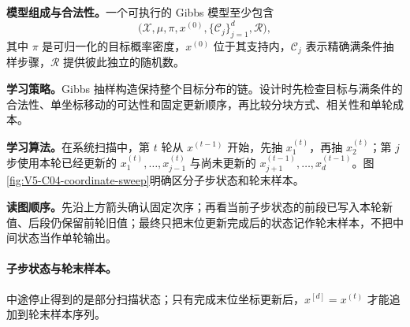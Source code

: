 \documentclass[UTF8,a4paper,11pt,openany]{ctexbook}
\begin{document}
\setcounter{page}{669}
\setcounter{chapter}{33}
\setcounter{figure}{2}
\pagestyle{headings}

\textbf{模型组成与合法性。}一个可执行的 Gibbs 模型至少包含
\[
\bigl(\mathcal X,\mu,\pi,x^{(0)},\{\mathcal C_j\}_{j=1}^d,\mathcal R\bigr),
\]
其中 $\pi$ 是可归一化的目标概率密度，$x^{(0)}$ 位于其支持内，$\mathcal C_j$ 表示精确满条件抽样步骤，$\mathcal R$ 提供彼此独立的随机数。

\textbf{学习策略。}Gibbs 抽样构造保持整个目标分布的链。设计时先检查目标与满条件的合法性、单坐标移动的可达性和固定更新顺序，再比较分块方式、相关性和单轮成本。

\textbf{学习算法。}在系统扫描中，第 $t$ 轮从 $x^{(t-1)}$ 开始，先抽 $x_1^{(t)}$，再抽 $x_2^{(t)}$；第 $j$ 步使用本轮已经更新的 $x_1^{(t)},\ldots,x_{j-1}^{(t)}$ 与尚未更新的 $x_{j+1}^{(t-1)},\ldots,x_d^{(t-1)}$。图\ref{fig:V5-C04-coordinate-sweep}明确区分子步状态和轮末样本。

\FloatBarrier
\noindent\textbf{读图顺序。}先沿上方箭头确认固定次序；再看当前子步状态的前段已写入本轮新值、后段仍保留前轮旧值；最终只把末位更新完成后的状态记作轮末样本，不把中间状态当作单轮输出。\par

\paragraph{子步状态与轮末样本。}中途停止得到的是部分扫描状态；只有完成末位坐标更新后，$x^{[d]}=x^{(t)}$ 才能追加到轮末样本序列。
\end{document}
